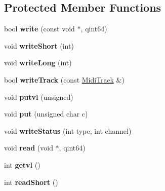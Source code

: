\subsection*{Protected Member Functions}
\begin{DoxyCompactItemize}
\item 
\mbox{\label{class_ms_1_1_midi_file_a96c6082dae7dffc86ee0d173a700c14b}} 
bool {\bfseries write} (const void $\ast$, qint64)
\item 
\mbox{\label{class_ms_1_1_midi_file_a70e964adc1025404111aaa47336a89a9}} 
void {\bfseries write\+Short} (int)
\item 
\mbox{\label{class_ms_1_1_midi_file_a34977bbb6e6a998f577de3009c901301}} 
void {\bfseries write\+Long} (int)
\item 
\mbox{\label{class_ms_1_1_midi_file_a3e203435dc54b4c6523342469f23d9c5}} 
bool {\bfseries write\+Track} (const \hyperlink{class_ms_1_1_midi_track}{Midi\+Track} \&)
\item 
\mbox{\label{class_ms_1_1_midi_file_a74a8d5c857a669a8fa7334bbf30c40e5}} 
void {\bfseries putvl} (unsigned)
\item 
\mbox{\label{class_ms_1_1_midi_file_a9bdfb669e279e81d8d116ae59722b7ae}} 
void {\bfseries put} (unsigned char c)
\item 
\mbox{\label{class_ms_1_1_midi_file_a5eeef9e557894cef8a8241925ce2b324}} 
void {\bfseries write\+Status} (int type, int channel)
\item 
\mbox{\label{class_ms_1_1_midi_file_af1925aeaf05cc9a4577311db1b1114ae}} 
void {\bfseries read} (void $\ast$, qint64)
\item 
\mbox{\label{class_ms_1_1_midi_file_ac7cc609e1b398dc33c42a8c902ac2608}} 
int {\bfseries getvl} ()
\item 
\mbox{\label{class_ms_1_1_midi_file_aaf8046d0a5e8da4ad02f52fca895f3f5}} 
int {\bfseries read\+Short} ()

\end{DoxyCompactItemize}
